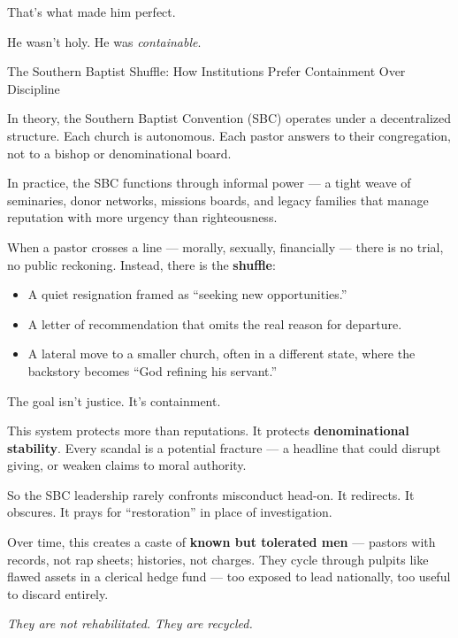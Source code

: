 That’s what made him perfect.

He wasn’t holy.  
He was \textit{containable}.

\medskip

\begin{HistoricalSidebar}{The Southern Baptist Shuffle: How Institutions Prefer Containment Over Discipline}

    In theory, the Southern Baptist Convention (SBC) operates under a decentralized structure.  
    Each church is autonomous.  
    Each pastor answers to their congregation, not to a bishop or denominational board.

    \medskip
    
    In practice, the SBC functions through informal power —  
    a tight weave of seminaries, donor networks, missions boards, and legacy families that manage reputation with more urgency than righteousness.
    
    \medskip
    
    When a pastor crosses a line — morally, sexually, financially — there is no trial, no public reckoning.  
    Instead, there is the \textbf{shuffle}:

    \medskip
    
    \begin{itemize}
      \item A quiet resignation framed as “seeking new opportunities.”  
      \item A letter of recommendation that omits the real reason for departure.  
      \item A lateral move to a smaller church, often in a different state, where the backstory becomes “God refining his servant.”  
    \end{itemize}

    \medskip
    
    The goal isn’t justice.  
    It’s containment.
    
    \medskip
    
    This system protects more than reputations.  
    It protects \textbf{denominational stability}.  
    Every scandal is a potential fracture — a headline that could disrupt giving, or weaken claims to moral authority.

    \medskip
    
    So the SBC leadership rarely confronts misconduct head-on.  
    It redirects.  
    It obscures.  
    It prays for “restoration” in place of investigation.
    
    \medskip
    
    Over time, this creates a caste of \textbf{known but tolerated men} —  
    pastors with records, not rap sheets; histories, not charges.  
    They cycle through pulpits like flawed assets in a clerical hedge fund — too exposed to lead nationally, too useful to discard entirely.

    \medskip
    
    \textit{They are not rehabilitated.  
    They are recycled.}
    
\end{HistoricalSidebar}




